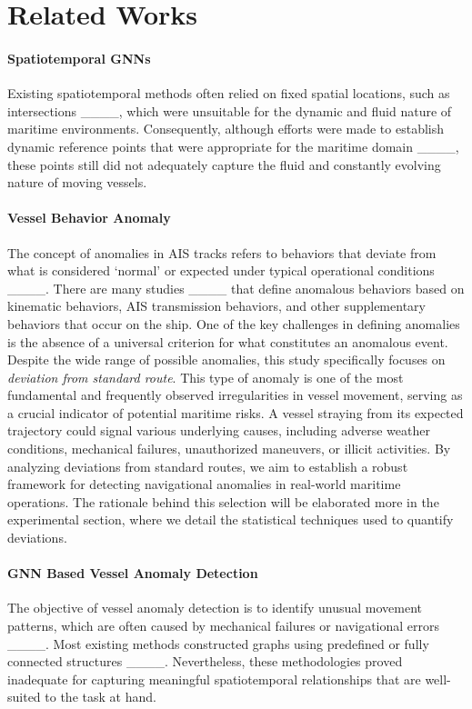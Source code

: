\section{Related Works}
\paragraph{Spatiotemporal GNNs}
Existing spatiotemporal methods often relied on fixed spatial locations, such as intersections ____, which were unsuitable for the dynamic and fluid nature of maritime environments. Consequently, although efforts were made to establish dynamic reference points that were appropriate for the maritime domain ____, these points still did not adequately capture the fluid and constantly evolving nature of moving vessels.

\paragraph{Vessel Behavior Anomaly}
The concept of anomalies in AIS tracks refers to behaviors that deviate from what is considered ‘normal’ or expected under typical operational conditions ____. There are many studies ____ that define anomalous behaviors based on kinematic behaviors,  AIS transmission behaviors, and other supplementary behaviors that occur on the ship. One of the key challenges in defining anomalies is the absence of a universal criterion for what constitutes an anomalous event. Despite the wide range of possible anomalies, this study specifically focuses on \textit{deviation from standard route}. This type of anomaly is one of the most fundamental and frequently observed irregularities in vessel movement, serving as a crucial indicator of potential maritime risks. A vessel straying from its expected trajectory could signal various underlying causes, including adverse weather conditions, mechanical failures, unauthorized maneuvers, or illicit activities. By analyzing deviations from standard routes, we aim to establish a robust framework for detecting navigational anomalies in real-world maritime operations. The rationale behind this selection will be elaborated more in the experimental section, where we detail the statistical techniques used to quantify deviations.

\paragraph{GNN Based Vessel Anomaly Detection}
The objective of vessel anomaly detection is to identify unusual movement patterns, which are often caused by mechanical failures or navigational errors ____. Most existing methods constructed graphs using predefined or fully connected structures ____. Nevertheless, these methodologies proved inadequate for capturing meaningful spatiotemporal relationships that are well-suited to the task at hand.